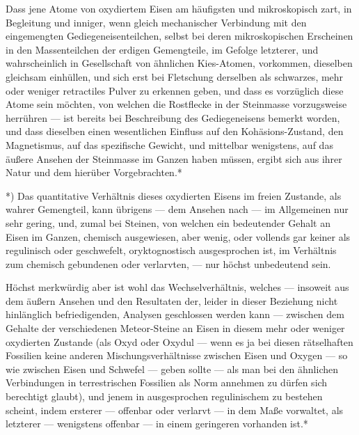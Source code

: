 \documentclass[a4paper, 11pt, oneside, german]{article}
\begin{document}
Dass jene Atome von oxydiertem Eisen am häufigsten und mikroskopisch zart, in Begleitung und inniger, wenn gleich mechanischer Verbindung mit den eingemengten Gediegeneisenteilchen, selbst bei deren mikroskopischen Erscheinen in den Massenteilchen der erdigen Gemengteile, im Gefolge letzterer, und wahrscheinlich in Gesellschaft von ähnlichen Kies-Atomen, vorkommen, dieselben gleichsam einhüllen, und sich erst bei Fletschung derselben als schwarzes, mehr oder weniger retractiles Pulver zu erkennen geben, und dass es vorzüglich diese Atome sein möchten, von welchen die Rostflecke in der Steinmasse vorzugsweise herrühren --- ist bereits bei Beschreibung des Gediegeneisens bemerkt worden, und dass dieselben einen wesentlichen Einfluss auf den Kohäsions-Zustand, den Magnetismus, auf das spezifische Gewicht, und mittelbar wenigstens, auf das äußere Ansehen der Steinmasse im Ganzen haben müssen, ergibt sich aus ihrer Natur und dem hierüber Vorgebrachten.*

*) Das quantitative Verhältnis dieses oxydierten Eisens im freien Zustande, als wahrer Gemengteil, kann übrigens --- dem Ansehen nach --- im Allgemeinen nur sehr gering, und, zumal bei Steinen, von welchen ein bedeutender Gehalt an Eisen im Ganzen, chemisch ausgewiesen, aber wenig, oder vollends gar keiner als regulinisch oder geschwefelt, oryktognostisch ausgesprochen ist, im Verhältnis zum chemisch gebundenen oder verlarvten, --- nur höchst unbedeutend sein.

Höchst merkwürdig aber ist wohl das Wechselverhältnis, welches --- insoweit aus dem äußern Ansehen und den Resultaten der, leider in dieser Beziehung nicht hinlänglich befriedigenden, Analysen geschlossen werden kann --- zwischen dem Gehalte der verschiedenen Meteor-Steine an Eisen in diesem mehr oder weniger oxydierten Zustande (als Oxyd oder Oxydul --- wenn es ja bei diesen rätselhaften Fossilien keine anderen Mischungsverhältnisse zwischen Eisen und Oxygen --- so wie zwischen Eisen und Schwefel --- geben sollte --- als man bei den ähnlichen Verbindungen in terrestrischen Fossilien als Norm annehmen zu dürfen sich berechtigt glaubt), und jenem in ausgesprochen regulinischem zu bestehen scheint, indem ersterer --- offenbar oder verlarvt --- in dem Maße vorwaltet, als letzterer --- wenigstens offenbar --- in einem geringeren vorhanden ist.*
\end{document}
